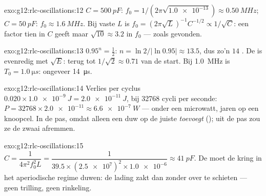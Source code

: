 \begin{solution}{exo:g12:rlc-oscillations:12}
$C = \qty{500}{pF}$: $f_0 = 1/(2\pi\sqrt{\num{1.0e-13}}) \approx
\qty{0.50}{MHz}$; $C = \qty{50}{pF}$: $f_0 \approx \qty{1.6}{MHz}$. Bij vaste
$L$ is $f_0 = (2\pi\sqrt{L})^{-1} C^{-1/2} \propto 1/\sqrt{C}$: een factor
tien in $C$ geeft maar $\sqrt{10} \approx 3.2$ in $f_0$ --- zoals gevonden.
\end{solution}

\begin{solution}{exo:g12:rlc-oscillations:13}
$0.95^n = \tfrac12$: $n = \ln 2/\lvert\ln 0.95\rvert \approx 13.5$, dus zo'n
$14$ . De  is evenredig met $\sqrt{E}$: terug tot
$1/\sqrt{2} \approx 0.71$ van de start. Bij \qty{1.0}{MHz} is
$T_0 = \qty{1.0}{\micro s}$: ongeveer \qty{14}{\micro s}.
\end{solution}

\begin{solution}{exo:g12:rlc-oscillations:14}
Verlies per cyclus $0.020 \times \qty{1.0e-9}{J} = \qty{2.0e-11}{J}$, bij
\num{32768} cycli per seconde: $P = \num{32768} \times \num{2.0e-11}
\approx \qty{6.6e-7}{W}$ --- onder een microwatt, jaren op een knoopcel. In de
pas, omdat alleen een duw op de juiste   \emph{toevoegt}
(); uit de pas zou ze de zwaai afremmen.
\end{solution}

\begin{solution}{exo:g12:rlc-oscillations:15}
$C = \dfrac{1}{4\pi^2 f_0^2 L} = \dfrac{1}{39.5 \times
(\num{2.5e7})^2 \times \num{1.0e-6}} \approx \qty{41}{pF}$. De  moet
de kring in het aperiodische regime duwen: de lading zakt dan zonder over te
schieten --- geen trilling, geen rinkeling.
\end{solution}

